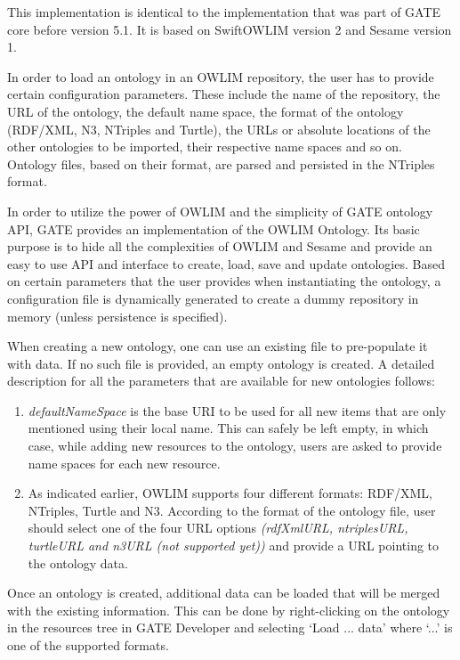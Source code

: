 {

This implementation is identical to the implementation that was part of 
GATE core before version 5.1. It is based on SwiftOWLIM version 2 and 
Sesame version 1.

In order to load an ontology in an OWLIM repository, the user has to provide certain
configuration parameters.  These include the name of the repository, the URL of the
ontology, the default name space, the format of the ontology (RDF/XML, N3, NTriples and
Turtle), the URLs or absolute locations of the other ontologies to be imported,
their respective name spaces and so on. Ontology files, based on their format,
are parsed and persisted in the NTriples format.

In order to utilize the power of OWLIM and the simplicity of GATE
ontology API, GATE provides an implementation of the OWLIM
Ontology. Its basic purpose is to hide all the complexities of OWLIM
and Sesame and provide an easy to use API and interface to create,
load, save and update ontologies. Based on certain parameters that
the user provides when instantiating the ontology, a configuration
file is dynamically generated to create a dummy repository in memory
(unless persistence is specified).

When creating a new ontology, one can use an existing file to pre-populate it
with data. If no such file is provided, an empty ontology is created. A detailed
description for all the parameters that are available for new ontologies
follows:

\begin{enumerate}
\item \emph{defaultNameSpace} is the base URI to be used for all new items that
are only mentioned using their local name.  This can safely be left empty, in
which case, while adding new resources to the ontology, users are asked to
provide name spaces for each new resource.
\item As indicated earlier, OWLIM supports four different formats: RDF/XML,
NTriples, Turtle and N3.  According to the format of the ontology file, user should
select one of the four URL options \emph{(rdfXmlURL, ntriplesURL, turtleURL and
n3URL (not supported yet))} and provide a URL pointing to the
ontology data.
\end{enumerate}

Once an ontology is created, additional data can be loaded that will
be merged with the existing information. This can be done by
right-clicking on the ontology in the resources tree in GATE Developer
and selecting `Load ... data' where `...' is one of the supported
formats.

}
